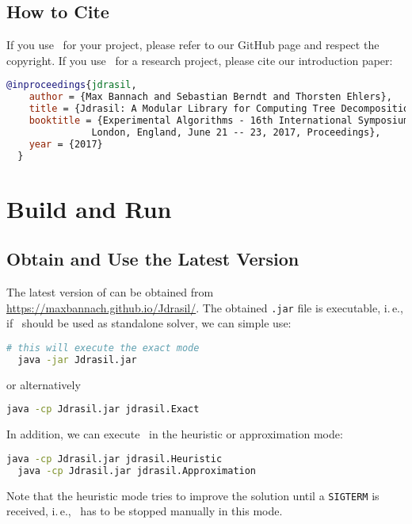 \documentclass[a4paper, ukenglish, twoside, openright]{jdrasilmanual}
\begin{document}
\section{How to Cite \Jdrasil}
If you use \Jdrasil\ for your project, please refer to our GitHub
page and respect the copyright. If you use \Jdrasil\ for a research
project, please cite our introduction paper:
\begin{lstlisting}[language=BibTeX]
  @inproceedings{jdrasil,
    author = {Max Bannach and Sebastian Berndt and Thorsten Ehlers},
    title = {Jdrasil: A Modular Library for Computing Tree Decompositions},
    booktitle = {Experimental Algorithms - 16th International Symposium, {SEA} 2017,
               London, England, June 21 -- 23, 2017, Proceedings},
    year = {2017}
  }
\end{lstlisting}
\chapter{Build and Run \Jdrasil}
\section{Obtain and Use the Latest Version}
The latest version of \Jdrasil{} can be obtained from
\url{https://maxbannach.github.io/Jdrasil/}. The obtained
\texttt{.jar} file is executable, i.\,e., if \Jdrasil\ should be used
as standalone solver, we can simple use:
\begin{lstlisting}[language=bash]
  # this will execute the exact mode
  java -jar Jdrasil.jar
\end{lstlisting}
or alternatively
\begin{lstlisting}[language=bash]
  java -cp Jdrasil.jar jdrasil.Exact
\end{lstlisting}
In addition, we can execute \Jdrasil\ in the heuristic or
approximation mode:
\begin{lstlisting}[language=bash]
  java -cp Jdrasil.jar jdrasil.Heuristic
  java -cp Jdrasil.jar jdrasil.Approximation
\end{lstlisting}
Note that the heuristic mode tries to improve the solution
until a \texttt{SIGTERM} is received, i.\,e., \Jdrasil\ has to be stopped
manually in this mode. 
\end{document}
